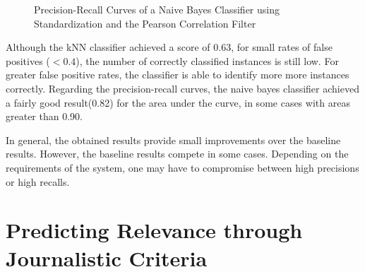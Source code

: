 \begin{figure}[H]
	\centering
	\caption[Precision-Recall Curves of a Naive Bayes Classifier using Standardization and the Pearson Correlation Filter]{Precision-Recall Curves of a Naive Bayes Classifier using Standardization and the Pearson Correlation Filter}
	\label{fig:feat-eng-pr-nb-pearson}
\end{figure}

Although the kNN classifier achieved a score of 0.63, for small rates of false positives ($<0.4$), the number of correctly classified instances is still low. For greater false positive rates, the classifier is able to identify more more instances correctly. Regarding the precision-recall curves, the naive bayes classifier achieved a fairly good result(0.82) for the area under the curve, in some cases with areas greater than 0.90. 

In general, the obtained results provide small improvements over the baseline results. However, the baseline results compete in some cases. Depending on the requirements of the system, one may have to compromise between high precisions or high recalls.

\section{Predicting Relevance through Journalistic Criteria}
\label{sec:jcriteria}


